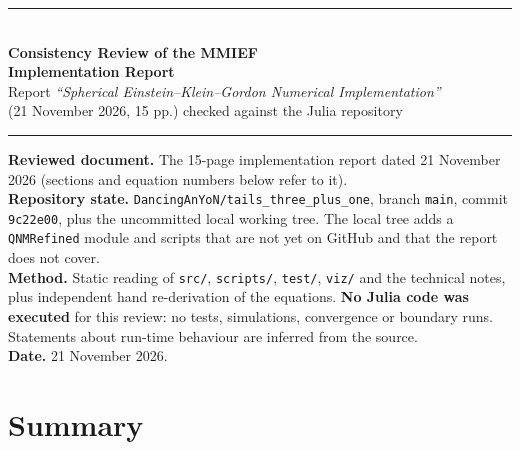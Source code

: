 \documentclass[11pt,a4paper]{article}
\begin{document}
\begin{center}
{\color{accent}\rule{\textwidth}{1.2pt}}\\[0.9em]
{\LARGE\bfseries Consistency Review of the MMIEF\\[0.25em] Implementation Report}\\[0.7em]
{\large\color{accent} Report \emph{``Spherical Einstein--Klein--Gordon Numerical Implementation''}\\
(21 November 2026, 15 pp.) checked against the Julia repository}\\[0.8em]
{\color{accent}\rule{\textwidth}{1.2pt}}
\end{center}

\begin{shaded}
\textbf{Reviewed document.} The 15-page implementation report dated 21 November 2026
(sections and equation numbers below refer to it).\\
\textbf{Repository state.} \texttt{DancingAnYoN/tails\_three\_plus\_one}, branch \texttt{main},
commit \texttt{9c22e00}, plus the uncommitted local working tree. The local tree adds a
\texttt{QNMRefined} module and scripts that are not yet on GitHub and that the report does not cover.\\
\textbf{Method.} Static reading of \texttt{src/}, \texttt{scripts/}, \texttt{test/}, \texttt{viz/} and the
technical notes, plus independent hand re-derivation of the equations.
\textbf{No Julia code was executed} for this review: no tests, simulations, convergence or
boundary runs. Statements about run-time behaviour are inferred from the source.\\
\textbf{Date.} 21 November 2026.
\end{shaded}

\section{Summary}
\end{document}
